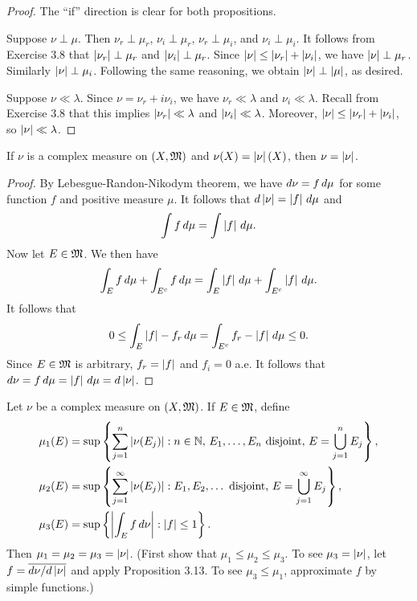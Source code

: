 \documentclass[a4paper]{article}
\begin{document}
\begin{proof}
The ``if'' direction is clear for both propositions.

Suppose $\nu \perp \mu$. Then $\nu_r \perp \mu_r$,
$\nu_i \perp \mu_r$, $\nu_r \perp \mu_i$, and $\nu_i \perp \mu_i$.
It follows from Exercise 3.8 that $\left\lvert \nu_r\right\rvert \perp \mu_r$ and $\left\lvert \nu_i\right\rvert
\perp \mu_r$. Since $\left\lvert \nu\right\rvert \leq \left\lvert \nu_r\right\rvert + \left\lvert \nu_i\right\rvert$, 
we have $\left\lvert \nu\right\rvert \perp \mu_r$. Similarly $\left\lvert \nu\right\rvert \perp \mu_i$.
Following the same reasoning, we obtain 
$\left\lvert \nu\right\rvert \perp \left\lvert \mu\right\rvert$, as desired.

Suppose $\nu \ll \lambda$. 
Since $\nu = \nu_r + i \nu_i$, we have 
$\nu_r \ll \lambda$ and $\nu_i \ll \lambda$. 
Recall from Exercise 3.8 that this implies $\left\lvert \nu_r\right\rvert \ll 
\lambda$ and $\left\lvert \nu_i\right\rvert \ll \lambda$. Moreover, 
$\left\lvert \nu\right\rvert \leq \left\lvert \nu_r\right\rvert + \left\lvert \nu_i\right\rvert$, so 
$\left\lvert \nu\right\rvert \ll \lambda$.
\end{proof}

\begin{ex}[Folland 3.20]
If $\nu$ is a complex measure on $(X, \mathfrak{M})$ and 
$\nu(X) = \left\lvert \nu\right\rvert(X)$, then $\nu = \left\lvert \nu\right\rvert$.
\end{ex}

\begin{proof}
By Lebesgue-Randon-Nikodym theorem, we have 
$d \nu = f \, d \mu$ for some function $f$ and positive 
measure $\mu$. It follows that $d \left\lvert \nu\right\rvert 
= \left\lvert f\right\rvert \, d \mu$ and 
\[
\int f \, d \mu = \int \left\lvert f\right\rvert \, d \mu.
\]
Now let $E \in \mathfrak{M}$. We then have 
\[
\int_E f \, d \mu + \int_{E^c} f \, d \mu = 
\int_E \left\lvert f\right\rvert \, d \mu + \int_{E^c} \left\lvert f\right\rvert \, d \mu.
\]
It follows that 
\[
0 \leq \int_{E} \left\lvert f\right\rvert - f_r \, d \mu
= \int_{E^c} f_r - \left\lvert f\right\rvert \, d \mu \leq 0.
\]
Since $E \in \mathfrak{M}$ is arbitrary, 
$f_r = \left\lvert f\right\rvert$ and $f_i = 0$ a.e. It follows that 
$d \nu = f \, d \mu = \left\lvert f\right\rvert \, d \mu = d \left\lvert \nu\right\rvert$.
\end{proof}

\begin{ex}[Folland 3.21]
Let $\nu$ be a complex measure on $(X, \mathfrak{M})$. If $E \in \mathfrak{M}$, 
define 
\[
\begin{aligned}
\mu_1 (E) 
&= \sup \left\{ \sum_{j=1}^n \left\lvert \nu(E_j)\right\rvert : \text{$n \in \mathbb{N}$, 
$E_1, \dots, E_n$ disjoint, $E = \bigcup_{j=1}^n E_j$} \right\}, \\
\mu_2 (E) 
&= \sup \left\{ \sum_{j=1}^\infty \left\lvert \nu(E_j)\right\rvert : 
\text{$E_1, E_2, \dots$ disjoint, $E = \bigcup_{j=1}^\infty E_j$} \right\}, \\
\mu_3 (E) 
&= \sup \left\{ \left\lvert \int_E f \, d \nu\right\rvert : \left\lvert f\right\rvert \leq 1 \right\}.
\end{aligned}
\]
Then $\mu_1 = \mu_2 = \mu_3 = \left\lvert \nu\right\rvert$. (First show that 
$\mu_1 \leq \mu_2 \leq \mu_3$. To see $\mu_3 = \left\lvert \nu\right\rvert$, 
let $f = \overline{d \nu / d \left\lvert \nu\right\rvert}$ and apply Proposition 3.13. 
To see $\mu_3 \leq \mu_1$, approximate $f$ by simple functions.)
\end{ex}
\end{document}
